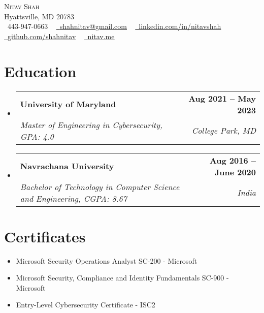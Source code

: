 \documentclass[letterpaper,11pt]{article}
\makeatletter
\newcommand{\resumeSubheading}[4]{
  \vspace{-2pt}\item
    \begin{tabular*}{1.0\textwidth}[t]{l@{\extracolsep{\fill}}r}
      \textbf{#1} & \textbf{\small #2} \\
      \textit{\small#3} & \textit{\small #4} \\
    \end{tabular*}\vspace{-7pt}
}
\newcommand{\resumeSubHeadingListStart}{\begin{itemize}[leftmargin=0.0in, label={}]}
\newcommand{\resumeSubHeadingListEnd}{\end{itemize}}
\makeatother
\begin{document}
\begin{center}
    {\Huge \scshape Nitav Shah} \\ \vspace{1pt}
    Hyattsville, MD 20783 \\ \vspace{1pt}
    \small \raisebox{-0.1\height}\faPhone\ 443-947-0663 ~ \href{mailto:shahnitav@gmail.com}{\raisebox{-0.2\height}\faEnvelope\  \underline{shahnitav@gmail.com}} ~ 
    \href{https://linkedin.com/in/nitavshah/}{\raisebox{-0.2\height}\faLinkedin\ \underline{linkedin.com/in/nitavshah}}  ~
    \href{https://github.com/shahnitav}{\raisebox{-0.2\height}\faGithub\ \underline{github.com/shahnitav}}  ~
    \href{https://nitav.me}{\raisebox{-0.2\height}\faGlobe\
    \underline{nitav.me}}
    \vspace{-8pt}
\end{center}


\section{Education}
  \resumeSubHeadingListStart
    \resumeSubheading
      {University of Maryland}{Aug 2021 -- May 2023}
      {Master of Engineering in Cybersecurity, GPA: 4.0}{College Park, MD}
  \resumeSubHeadingListEnd
  \resumeSubHeadingListStart
    \resumeSubheading
      {Navrachana University}{Aug 2016 -- June 2020}
      {Bachelor of Technology in Computer Science and Engineering, CGPA: 8.67}{India}
  \resumeSubHeadingListEnd
  
\section{Certificates}
        \begin{itemize}
            \item Microsoft Security Operations Analyst SC-200 - Microsoft
            \vspace{-0.8em} \item Microsoft Security, Compliance and Identity Fundamentals SC-900 - Microsoft
            \vspace{-0.8em} \item  Entry-Level Cybersecurity Certificate - ISC2 
        \end{itemize}
\vspace{-16pt}

\end{document}

